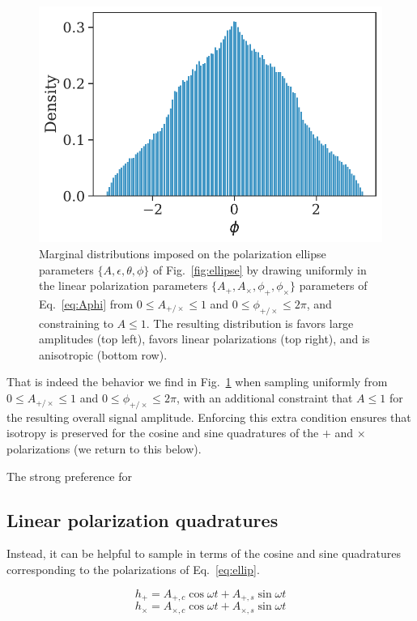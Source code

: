 \documentclass[aps,prd,twocolumn,superscriptaddress,preprintnumbers,floatfix,nofootinbib]{revtex4-2}
\begin{document}
\begin{figure}
\includegraphics[width=\columnwidth]{jac_Aellip_Aphi_phi}
\caption{Marginal distributions imposed on the polarization ellipse parameters $\{A, \epsilon, \theta, \phi\}$ of Fig.~\ref{fig:ellipse} by drawing uniformly in the linear polarization parameters $\{A_+, A_\times, \phi_+, \phi_\times\}$ parameters of Eq.~\eqref{eq:Aphi} from $0\leq A_{+/\times} \leq 1$ and $0 \leq \phi_{+/\times} \leq 2\pi$, and constraining to $A \leq 1$.
The resulting distribution is favors large amplitudes (top left), favors linear polarizations (top right), and is anisotropic (bottom row).
}
\label{fig:jac_Aphi_pars}
\end{figure}

That is indeed the behavior we find in Fig.~\ref{fig:jac_Aphi_pars} when sampling uniformly from $0\leq A_{+/\times} \leq 1$ and $0 \leq \phi_{+/\times} \leq 2\pi$, with an additional constraint that $A \leq 1$ for the resulting overall signal amplitude.
Enforcing this extra condition ensures that isotropy is preserved for the cosine and sine quadratures of the $+$ and $\times$ polarizations (we return to this below).

The strong preference for 

\subsection{Linear polarization quadratures}

Instead, it can be helpful to sample in terms of the cosine and sine quadratures corresponding to the polarizations of Eq.~\eqref{eq:ellip}.

\begin{equation}
h_+ = A_{+,c} \cos \omega t + A_{+,s} \sin \omega t
\end{equation}
\begin{equation}
h_\times = A_{\times,c} \cos \omega t + A_{\times,s} \sin \omega t
\end{equation}
\end{document}
